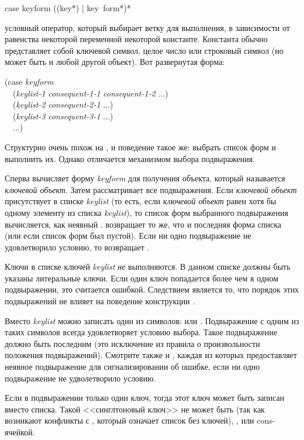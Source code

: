 \begin{defmac}
case keyform {({({key}*) | key} {\,form}*)}*

 условный оператор, который выбирает ветку для выполнения, в
зависимости от равенства некоторой переменной некоторой константе. Константа
обычно представляет собой ключевой символ, целое число или строковый символ (но
может быть и любой другой объект). Вот развернутая форма:
\begin{lisp}
(case \emph{keyform} \\
~~(\emph{keylist-1} \emph{consequent-1-1} \emph{consequent-1-2} ...) \\
~~(\emph{keylist-2} \emph{consequent-2-1} ...) \\
~~(\emph{keylist-3} \emph{consequent-3-1} ...) \\
~~...)
\end{lisp}
Структурно  очень похож на , и поведение такое же: выбрать
список форм и выполнить их.
Однако  отличается механизмом выбора подвыражения.

Сперва  вычисляет форму \emph{keyform} для получения объекта, который
называется \emph{ключевой объект}.
Затем  рассматривает все подвыражения. Если \emph{ключевой объект}
присутствует в списке \emph{keylist} (то есть, если \emph{ключевой объект} равен
 хотя бы одному элементу из списка \emph{keylist}), то список форм
выбранного подвыражения вычисляется, как неявный .
 возвращает то же, что и последняя форма списка (или {\false} если
список форм был пустой).
Если ни одно подвыражение не удовлетворило условию, то  возвращает
{\false}.

Ключи в списке ключей \emph{keylist} \emph{не} выполняются. В данном списке
должны быть указаны литеральные ключи.
Если один ключ попадается более чем в одном подвыражении, это считается
ошибкой.
Следствием является то, что порядок этих подвыражений не влияет на поведение
конструкции .

Вместо \emph{keylist} можно записать один из символов: {\true} или
. Подвыражение с одним из таких символов всегда удовлетворяет
условию выбора. Такое подвыражение должно быть последним (это исключение из
правила о произвольности положения подвыражений).
Смотрите также  и , каждая из которых предоставляет
неявное  подвыражение для сигнализировании об ошибке, если ни
одно подвыражение не удволетворило условию.

Если в подвыражении только один ключ, тогда этот ключ может быть записан вместо
списка.
Такой <<синглтоновый ключ>> не может быть {\nil} (так как возникают конфликты с
{\emptylist}, который означает список без ключей), {\true},  или
cons-ячейкой.
\end{defmac}

